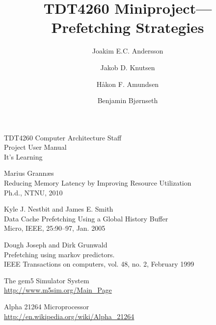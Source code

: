 \documentclass[journal]{IEEEtran/IEEEtran}
\title{TDT4260 Miniproject---Prefetching Strategies}
\author{Joakim E.C. Andersson \and Jakob D. Knutsen \and Håkon F. Amundsen \and Benjamin Bjørnseth}
\begin{document}
\maketitle











\begin{thebibliography}{9}

TDT4260 Computer Architecture Staff\\
Project User Manual\\
It's Learning

Marius Grannæs\\
Reducing Memory Latency by Improving Resource Utilization\\
Ph.d., NTNU, 2010

Kyle J. Nestbit and James E. Smith\\
Data Cache Prefetching Using a Global History Buffer\\
Micro, IEEE, 25:90–97, Jan. 2005

Dough Joseph and Dirk Grunwald\\
Prefetching using markov predictors.\\
IEEE Transactions on computers, vol. 48, no. 2, February 1999

The gem5 Simulator System\\
\url{http://www.m5sim.org/Main_Page}

Alpha 21264 Microprocessor\\
\url{http://en.wikipedia.org/wiki/Alpha_21264}

\end{thebibliography}
\end{document}
